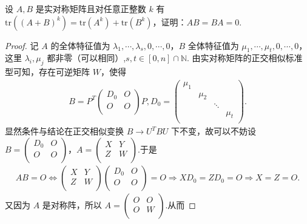 \documentclass[../../main.tex]{subfiles}%
\begin{document}
\begin{example}\label{example:例题611}
设 $A,B$ 是实对称矩阵且对任意正整数 $k$ 有 $\mathrm{tr}\left( \left( A+B \right) ^k \right) =\mathrm{tr}\left( A^k \right) +\mathrm{tr}\left( B^k \right) $，证明：$AB=BA=0$.
\end{example}
\begin{proof}

记 $A$ 的全体特征值为 $\lambda_1,\cdots,\lambda_s,0,\cdots,0$，$B$ 全体特征值为 $\mu_1,\cdots,\mu_t,0,\cdots,0$，这里 $\lambda_i,\mu_j$ 都非零（可以相同）,$s,t\in[0,n]\cap \mathbb{N}$.
由实对称矩阵的正交相似标准型可知，存在可逆矩阵 $W$，使得
\begin{align*}
B=P^T\begin{pmatrix}
D_0&		O\\
O&		O\\
\end{pmatrix}P,D_0=\begin{pmatrix}
\mu _1&		&		&		\\
&		\mu _2&		&		\\
&		&		\ddots&		\\
&		&		&		\mu _t\\
\end{pmatrix}.
\end{align*}
显然条件与结论在正交相似变换 $B\rightarrow U^TBU$ 下不变，故可以不妨设 $B=\begin{pmatrix}
D_0&		O\\
O&		O\\
\end{pmatrix}$，$A=\begin{pmatrix}
X&		Y\\
Z&		W\\
\end{pmatrix}$.于是
\begin{align*}
AB=O\Longleftrightarrow \begin{pmatrix}
X&		Y\\
Z&		W\\
\end{pmatrix} \begin{pmatrix}
D_0&		O\\
O&		O\\
\end{pmatrix} =O\Rightarrow XD_0=ZD_0=O\Rightarrow X=Z=O.
\end{align*}
又因为 $A$ 是对称阵，所以 $A=\begin{pmatrix}
O&		O\\
O&		W\\
\end{pmatrix}$.从而

\end{proof}
\end{document}
